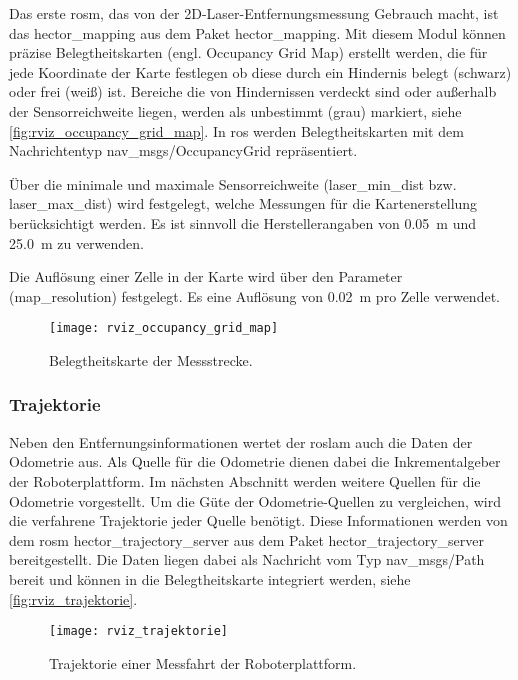 Das erste \Gls{rosm}, das von der 2D-Laser-Entfernungsmessung Gebrauch macht, ist das hector\_mapping aus dem Paket hector\_mapping. Mit diesem Modul können präzise Belegtheitskarten (engl. Occupancy Grid Map) erstellt werden, die für jede Koordinate der Karte festlegen ob diese durch ein Hindernis belegt (schwarz) oder frei (weiß) ist. Bereiche die von Hindernissen verdeckt sind oder außerhalb der Sensorreichweite liegen, werden als unbestimmt (grau) markiert, siehe \autoref{fig:rviz_occupancy_grid_map}. In \Gls{ros} werden Belegtheitskarten mit dem Nachrichtentyp nav\_msgs/OccupancyGrid repräsentiert.

Über die minimale und maximale Sensorreichweite (laser\_min\_dist bzw. laser\_max\_dist) wird festgelegt, welche Messungen für die Kartenerstellung berücksichtigt werden. Es ist sinnvoll die Herstellerangaben von \SI{0.05}{\meter} und \SI{25.0}{\meter} zu verwenden.

Die Auflösung einer Zelle in der Karte wird über den Parameter (map\_resolution) festgelegt. Es eine Auflösung von \SI{0.02}{\meter} pro Zelle verwendet.

\begin{figure}
	\centering
	\texttt{[image: rviz\_occupancy\_grid\_map]}
	\caption{Belegtheitskarte der Messstrecke.}
	\label{fig:rviz_occupancy_grid_map}
\end{figure}
 

%
%
\subsubsection{Trajektorie}

Neben den Entfernungsinformationen wertet der \Gls{roslam} auch die Daten der Odometrie aus. Als Quelle für die Odometrie dienen dabei die Inkrementalgeber der Roboterplattform. Im nächsten Abschnitt werden weitere Quellen für die Odometrie vorgestellt. Um die Güte der Odometrie-Quellen zu vergleichen, wird die verfahrene Trajektorie jeder Quelle benötigt. Diese Informationen werden von dem \Gls{rosm} hector\_trajectory\_server aus dem Paket hector\_trajectory\_server bereitgestellt. Die Daten liegen dabei als Nachricht vom Typ nav\_msgs/Path bereit und können in die Belegtheitskarte integriert werden, siehe \autoref{fig:rviz_trajektorie}.

\begin{figure}
	\centering
	\texttt{[image: rviz\_trajektorie]}
	\caption{Trajektorie einer Messfahrt der Roboterplattform.}
	\label{fig:rviz_trajektorie}
\end{figure}


